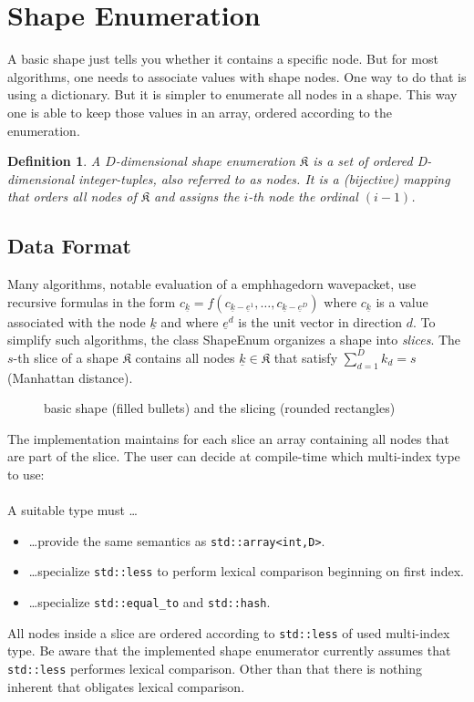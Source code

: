 \documentclass{article}
\def\code#1{\texttt{#1}}
\newtheorem{definition}{Definition}
\begin{document}
\section{Shape Enumeration}

A basic shape just tells you whether it contains a specific node. But
for most algorithms, one needs to associate values with shape nodes. One way to
do that is using a dictionary. But it is simpler to enumerate all nodes in a shape.
This way one is able to keep those values in an array, ordered according to the enumeration.

\begin{definition}
A \( D \)-dimensional shape enumeration \( \mathfrak{K} \) is a 
set of ordered D-dimensional integer-tuples, also referred to as \emph{nodes}. It is a (bijective) mapping that orders all nodes of \( \mathfrak{K} \) and assigns the \(i\)-th node the ordinal \( (i-1) \).
\end{definition}

\subsection{Data Format}
Many algorithms, notable evaluation of a emph{hagedorn wavepacket}, use recursive formulas in the form 
\( c_{\underline{k}} = f(c_{\underline{k}-\underline{e}^1}, \ldots, c_{\underline{k}-\underline{e}^D}) \)
where \( c_{\underline{k}} \) is a value associated with the node \( \underline{k} \)
and where \( \underline{e}^d \) is the unit vector in direction \( d \).
To simplify such algorithms, the class ShapeEnum organizes a shape into \emph{slices}. 
The \( s \)-th slice of a shape \( \mathfrak{K} \) contains all nodes \(
\underline{k} \in \mathfrak{K} \) that satisfy \( \sum_{d=1}^{D} k_d = s \) (Manhattan distance).

\begin{figure}[ht]
    \centering
    
    \caption{basic shape (filled bullets) and the slicing (rounded rectangles)}
\end{figure}

The implementation maintains for each slice an array containing all nodes that are part of the slice. The user can decide at compile-time which multi-index type to use:
 \\ \\ A suitable type must \dots
\begin{itemize}
\item \dots provide the same semantics as \code{std::array<int,D>}.
\item \dots specialize \code{std::less} to perform lexical comparison beginning on first index.
\item \dots specialize \code{std::equal\_to} and \code{std::hash}.
\end{itemize}
All nodes inside a slice are ordered according to \code{std::less} of used multi-index type. Be aware that the implemented shape enumerator currently assumes that \code{std::less} performes lexical comparison. Other than that there is nothing inherent that obligates lexical comparison.
\end{document}
